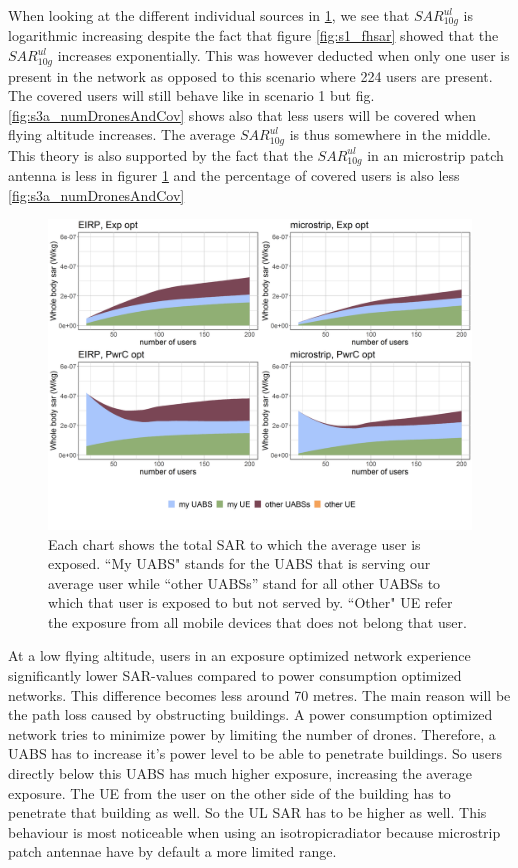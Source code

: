 When looking at the different individual sources in \ref{fig:s3a_fourSourcesMatrix}, we see 
that $SAR_{10g}^{ul}$ is logarithmic increasing despite the fact that figure \ref{fig:s1_fhsar} showed that the $SAR_{10g}^{ul}$
increases exponentially. This was however deducted when only one user is present in the network as opposed to this scenario 
where 224 users are present. The covered users will still behave like in scenario 1 but fig. \ref{fig:s3a_numDronesAndCov} 
shows also that less users will be covered when flying altitude increases. The average $SAR_{10g}^{ul}$ is thus somewhere in the middle.
This theory is also supported by the fact that the $SAR_{10g}^{ul}$ in an microstrip patch antenna is less in figurer \ref{fig:s3a_fourSourcesMatrix} 
and the percentage of covered users is also less \ref{fig:s3a_numDronesAndCov}

\begin{figure}[]
  \includegraphics[width=\textwidth]{../results/s3/fhFourSources.png}
  \caption{Each chart shows the total SAR to which the average user is exposed. ``My UABS" stands for the UABS that is serving our average user while ``other UABSs'' stand for 
  all other UABSs to which that user is exposed to but not served by. ``Other" UE refer the exposure from all mobile devices that does not belong that user.}
  \label{fig:s3a_fourSourcesMatrix}
\end{figure}

At a low flying altitude, users in an exposure optimized network experience significantly lower \gls{SAR}-values compared to power consumption optimized networks. This difference becomes less 
around 70 metres. The main reason will be the path loss caused by obstructing buildings. A power consumption optimized network tries to minimize power by limiting the 
number of drones. Therefore,  a \gls{UABS} has to increase it's power level to be able to penetrate buildings. So users directly below this \gls{UABS} 
has much higher exposure, increasing the  average exposure. The \gls{UE} from the user on the other side of the building has to penetrate that building as well.
So the \gls{UL} \gls{SAR} has to be higher as well. This behaviour is most noticeable when using an \gls{isotropicradiator} because microstrip patch antennae have by default a more limited range.

